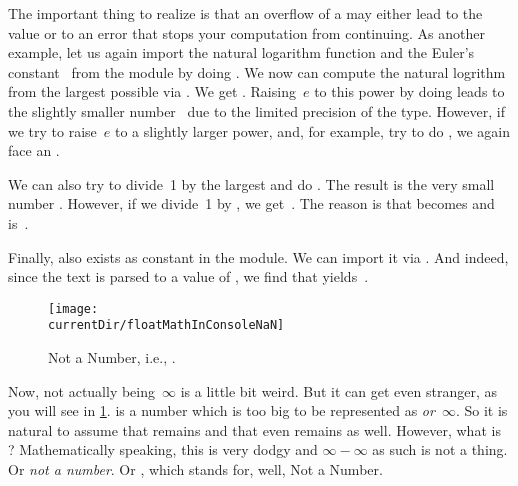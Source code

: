 The important thing to realize is that an overflow of a  may either lead to the  value or to an error that stops your computation from continuing.
As another example, let us again import the natural logarithm function  and the Euler's constant~ from the  module by doing .
We now can compute the natural logrithm from the largest possible  via .
We get .
Raising~$e$ to this power by doing  leads to the slightly smaller number~ due to the limited precision of the  type.
However, if we try to raise~$e$ to a slightly larger power, and, for example, try to do , we again face an .

We can also try to divide~1 by the largest  and do \pythonIdx{/}.
The result is the very small number .
However, if we divide~1 by , we get~.
The reason is that  becomes  and \pythonIdx{/} is~.

Finally,  also exists as constant in the  module.
We can import it via .
And indeed, since the text  is parsed to a  value of , we find that  yields~.

\begin{figure}%
\centering%
\texttt{[image: \\currentDir/floatMathInConsoleNaN]}%
\caption{Not a Number, i.e., .}%
\label{fig:floatMathInConsoleNaN}%
\end{figure}%

Now,  not actually being~$\infty$ is a little bit weird.
But it can get even stranger, as you will see in \cref{fig:floatMathInConsoleNaN}.
 is a number which is too big to be represented as  \emph{or}~$\infty$.
So it is natural to assume that  remains  and that even  remains  as well.
However, what is ?
Mathematically speaking, this is very dodgy and $\infty-\infty$ as such is not a thing.
Or \emph{not a number}.
Or , which stands for, well, Not a Number.

